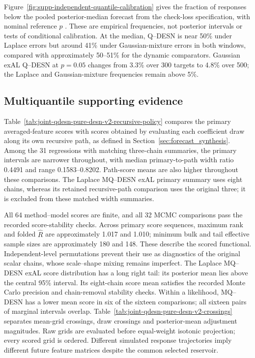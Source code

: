 \documentclass[12pt,letterpaper]{article}
\numberwithin{suppalgorithm}{section}
\numberwithin{equation}{section}
\numberwithin{table}{section}
\numberwithin{figure}{section}
\begin{document}
Figure~\ref{fig:supp-independent-quantile-calibration} gives the fraction
of responses below the pooled posterior-median forecast from the
check-loss specification, with nominal reference \(p\)
\citep{GneitingResin2023Calibration}. These are empirical frequencies,
not posterior intervals or tests of conditional calibration.
At the median, Q--DESN is near 50\% under Laplace errors but around
41\% under Gaussian-mixture errors in both windows, compared with
approximately 50--51\% for the dynamic comparators. Gaussian exAL
Q--DESN at \(p=0.05\) changes from 3.3\% over 300 targets to 4.8\%
over 500; the Laplace and Gaussian-mixture frequencies remain above 5\%.



\subsection{Multiquantile supporting evidence}

Table~\ref{tab:joint-qdesn-pure-desn-v2-recursive-policy} compares the
primary averaged-feature scores with scores obtained by evaluating each
coefficient draw along its own recursive path, as defined in
Section~\ref{sec:forecast_synthesis}. Among the 31 regressions with matching
three-chain summaries, the primary intervals are narrower throughout,
with median primary-to-path width ratio 0.4491 and range 0.1583--0.8202.
Path-score means are also higher throughout these comparisons. The
Laplace MQ--DESN exAL primary summary uses eight chains, whereas its
retained recursive-path comparison uses the original three; it is excluded
from these matched width summaries.



All 64 method--model scores are finite, and all 32 MCMC comparisons pass
the recorded score-stability checks. Across primary score sequences,
maximum rank and folded \(\widehat R\) are approximately 1.017 and 1.010;
minimum bulk and tail effective sample sizes are approximately 180 and
148. These describe the scored functional. Independent-level permutations
prevent their use as diagnostics of the original scalar chains, whose
scale--shape mixing remains imperfect.
The Laplace MQ--DESN exAL score distribution has a long right tail:
its posterior mean lies above the central 95\% interval. Its eight-chain
score mean satisfies the recorded Monte Carlo precision and chain-removal
stability checks. Within a likelihood, MQ--DESN has a lower mean score in
six of the sixteen comparisons; all sixteen pairs of marginal intervals
overlap.
Table~\ref{tab:joint-qdesn-pure-desn-v2-crossings} separates mean-grid
crossings, draw crossings and posterior-mean adjustment magnitudes.
Raw grids are evaluated before equal-weight isotonic projection; every
scored grid is ordered. Different simulated response trajectories imply
different future feature matrices despite the common selected reservoir.
\end{document}
